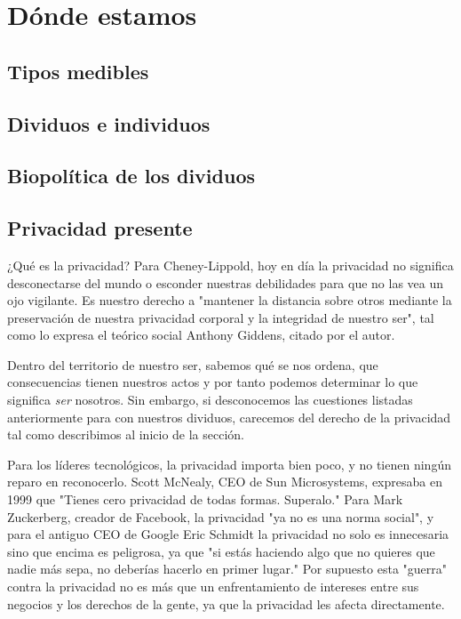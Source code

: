 \documentclass[11pt]{article}
\begin{document}
\section{Dónde estamos}
\subsection{Tipos medibles}
\subsection{Dividuos e individuos}
\subsection{Biopolítica de los dividuos}
\subsection{Privacidad presente}
¿Qué es la privacidad? Para Cheney-Lippold, hoy en día la privacidad no significa desconectarse del mundo o esconder nuestras debilidades para que no las vea un ojo vigilante. Es nuestro derecho a "mantener la distancia sobre otros mediante la preservación de nuestra privacidad corporal y la integridad de nuestro ser", tal como lo expresa el teórico social Anthony Giddens, citado por el autor. 

Dentro del territorio de nuestro ser, sabemos qué se nos ordena, que consecuencias tienen nuestros actos y por tanto podemos determinar lo que significa \textit{ser} nosotros. Sin embargo, si desconocemos las cuestiones listadas anteriormente para con nuestros dividuos, carecemos del derecho de la privacidad tal como describimos al inicio de la sección.

Para los líderes tecnológicos, la privacidad importa bien poco, y no tienen ningún reparo en reconocerlo. Scott McNealy, CEO de Sun Microsystems, expresaba en 1999 que "Tienes cero privacidad de todas formas. Superalo." Para Mark Zuckerberg, creador de Facebook, la privacidad "ya no es una norma social", y para el antiguo CEO de Google Eric Schmidt la privacidad no solo es innecesaria sino que encima es peligrosa, ya que "si estás haciendo algo que no quieres que nadie más sepa, no deberías hacerlo en primer lugar." Por supuesto esta "guerra" contra la privacidad no es más que un enfrentamiento de intereses entre sus negocios y los derechos de la gente, ya que la privacidad les afecta directamente.
\end{document}
